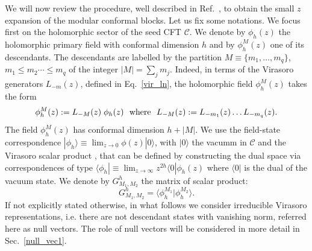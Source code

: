 \documentclass[a4paper,11pt]{article}
\begin{document}
We will now review the procedure, well described in Ref.~\cite{Collier}, to obtain the small $z$ expansion  of  the modular conformal blocks.  Let us fix some notations. We focus first on the holomorphic sector of the seed CFT $\mathcal{C}$. We denote by $\phi_{h}(z)$  the holomorphic primary field with conformal dimension $h$  and by $\phi_{h}^{M}(z)$ one of its descendants. The descendants are labelled by the partition  $M\equiv\{m_1,\dots,m_q\}$, $m_1\leq m_2\cdots\leq m_q$ of the integer  $|M|=\sum_{j} m_j$. Indeed, in terms of the  Virasoro generators $L_{-m}(z)$, defined in Eq.~\eqref{vir_ln}, the holomorphic field $\phi_{h}^{M}(z)$ takes the form
\begin{equation}
\label{desc}
 \phi_{h}^{M}(z):=L_{-M}(z)\;\phi_h(z)~~{\rm{where}}~~ L_{-M}(z):=L_{-m_1}(z)\dots L_{-m_q}(z).
 \end{equation}
The field  $\phi_{h}^{M}(z)$ has conformal dimension $h+|M|$. We use the field-state correspondence $|\phi_{h}\rangle\equiv \lim_{z\to 0}\phi(z)|0\rangle$, with $|0\rangle$ the vacumm in $\mathcal{C}$ and the Virasoro scalar product \cite{DiFrancesco}, that can be defined  by constructing the dual space  via correspondences of type  $\langle \phi_{h} |\equiv\lim_{z\rightarrow\infty}z^{2h}\langle 0|\phi_h(z)$ where $\langle 0|$ is the dual of the vacuum state. We denote by  $G^{h}_{M_1,M_2}$ the matrix of scalar product:
\begin{equation}
G^{h}_{M_1,M_2} = \langle \phi_{h}^{M_1}|\phi_{h}^{M_2}\rangle. 
\end{equation}
If not explicitly stated otherwise, in what follows we consider irreducible Virasoro representations, i.e. there are not descendant states with vanishing norm, referred here as null vectors. The role of null vectors will be considered in more detail in Sec.~\ref{null_vec1}.  
\end{document}
